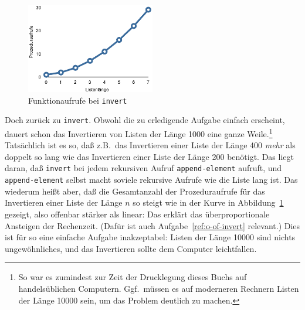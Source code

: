 %
\begin{figure}[tb]
  \centering
  \includegraphics[width=0.5\textwidth]{invert-calls.eps}
  \caption{Funktionaufrufe bei \texttt{invert}}
  \label{fig:invert-calls}
\end{figure}
%
Doch zurück zu \texttt{invert}.  Obwohl die zu erledigende Aufgabe
einfach erscheint, dauert schon das Invertieren von Listen der Länge
1000 eine ganze Weile.\footnote{So war es zumindest zur Zeit der
  Drucklegung dieses Buchs auf handelsüblichen Computern.  Ggf.\
  müssen es auf moderneren Rechnern Listen der Länge 10000 sein, um
  das Problem deutlich zu machen.}  
Tatsächlich ist es so, daß z.B.\
das Invertieren einer Liste der Länge 400 \emph{mehr} als doppelt so
lang wie das Invertieren einer Liste der Länge 200 benötigt.  Das
liegt daran, daß \texttt{invert} bei jedem rekursiven Aufruf
\texttt{append-element} aufruft, und \texttt{append-element} selbst
macht soviele rekursive Aufrufe wie die Liste lang ist.  Das wiederum
heißt aber, daß die Gesamtanzahl der Prozeduraufrufe für das
Invertieren einer Liste der Länge $n$ so steigt wie in
der Kurve in Abbildung~\ref{fig:invert-calls} gezeigt, also offenbar
stärker als linear: Das erklärt das überproportionale Ansteigen der
Rechenzeit.  (Dafür ist auch Aufgabe~\ref{ref:o-of-invert} relevant.)
Dies ist für so eine einfache Aufgabe
inakzeptabel: Listen der Länge 10000 sind nichts ungewöhnliches, und
das Invertieren sollte dem Computer leichtfallen.

